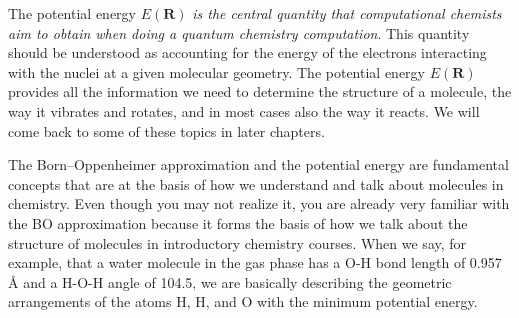 \documentclass[../Main/notes.tex]{subfiles}
\begin{document}
The  potential energy $E(\mathbf{R})$ \emph{is the central quantity that computational chemists aim to obtain when doing a quantum chemistry computation}.
This quantity should be understood as accounting for the energy of the electrons interacting with the nuclei at a given molecular geometry.
The potential energy $E(\mathbf{R})$ provides all the information we need to determine the structure of a molecule, the way it vibrates and rotates, and in most cases also the way it reacts.
We will come back to some of these topics in later chapters.

The Born--Oppenheimer approximation and the potential energy are fundamental concepts that are at the basis of how we understand and talk about molecules in chemistry.
Even though you may not realize it, you are already very familiar with the BO approximation because it forms the basis of how we talk about the structure of molecules in introductory chemistry courses.
When we say, for example, that a water molecule in the gas phase has a O-H bond length of  0.957 \AA{} and a H-O-H angle of 104.5\textdegree, we are basically describing the geometric arrangements of the atoms H, H, and O with the minimum potential energy.


\end{document}
